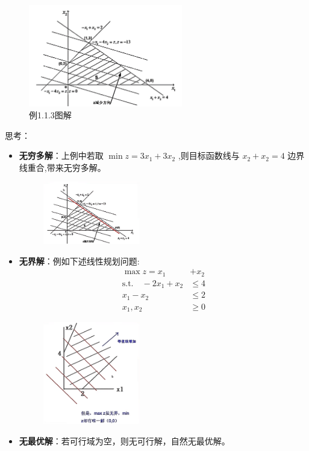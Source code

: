     \begin{figure}[H]
        \centering
        \includegraphics[width=0.6\textwidth]{./image/1.png}
        \caption{例1.1.3图解}
        \label{fig:Chapter2_Temporary_Pavilion_1}
    \end{figure}
    思考：
    \begin{itemize}
        \item \textbf{无穷多解}：上例中若取 $\min z = 3x_1 + 3x_2$ ,则目标函数线与 $x_2 + x_2 = 4$ 边界线重合,带来无穷多解。
        \begin{figure}[H]
            \centering
            \includegraphics[width=0.4\textwidth]{./image/2.png}
            \label{fig:Chapter2_Temporary_Pavilion_2}
        \end{figure}
        \item \textbf{无界解}：例如下述线性规划问题:
        \begin{align*}
        \max z = x_1 &+ x_2 \\
        \text{s.t.} \quad  -2x_1 + x_2 & \leq 4 \\
         x_1 - x_2 & \leq 2 \\
         x_1, x_2 & \geq 0
        \end{align*}
        \begin{figure}[H]
            \centering
            \includegraphics[width=0.4\textwidth]{./image/3.png}
            \label{fig:Chapter2_Temporary_Pavilion_3}
        \end{figure}
        \item \textbf{无最优解}：若可行域为空，则无可行解，自然无最优解。
    \end{itemize}


